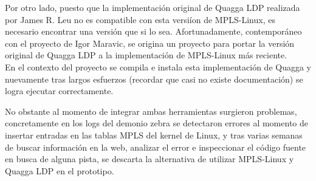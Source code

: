 Por otro lado, puesto que la implementaci\'on original de Quagga LDP realizada por James R. Leu no es compatible con esta versi\'ion de MPLS-Linux, es necesario encontrar una versi\'on que si lo sea. Afortunadamente, contemporáneo con el proyecto de Igor Maravic, se origina un proyecto\citep{QuaggaLDP2} para portar la versi\'on original de Quagga LDP a la implementaci\'on de MPLS-Linux m\'as reciente.\\

En el contexto del proyecto se compila e instala esta implementaci\'on de Quagga y nuevamente tras largos esfuerzos (recordar que casi no existe documentación) se logra ejecutar correctamente. 

No obstante al momento de integrar ambas herramientas surgieron problemas, concretamente en los logs del demonio zebra se detectaron errores al momento de insertar entradas en las tablas MPLS del kernel de Linux, y tras varias semanas de buscar informaci\'on en la web, analizar el error e inspeccionar el código fuente en busca de alguna pista, se descarta la alternativa de utilizar MPLS-Linux y Quagga LDP en el prototipo. 
